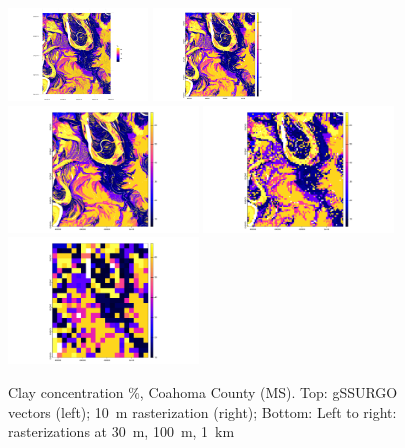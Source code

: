 \documentclass[soil, manuscript]{copernicus}
\begin{document}
\begin{figure}
  \includegraphics[width=0.33\textwidth]{gssurgo-vectors.png}
  \hfill
  \includegraphics[width=0.33\textwidth]{ggsurgo-to-raster-10m.png}
  \\
  \includegraphics[width=0.45\textwidth]{ggsurgo-to-raster-30m.png}
  \hfill
  \includegraphics[width=0.45\textwidth]{ggsurgo-to-raster-250m.png}
  \hfill
  \includegraphics[width=0.45\textwidth]{ggsurgo-to-raster-1km.png}
 \caption{Clay concentration \%, Coahoma County (MS). Top: gSSURGO vectors (left); 10~m rasterization (right); Bottom: Left to right: rasterizations at 30~m, 100~m, 1~km}
  \label{fig:coahoma_clay}
\end{figure}
\end{document}
